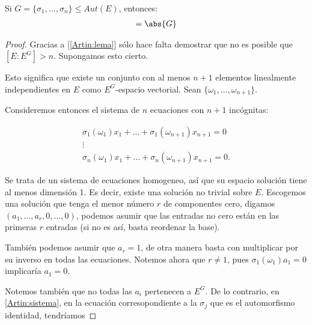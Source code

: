 ﻿

\begin{teorema}[Artin]
    Si $G=\{ \sigma_1, \dots, \sigma_n \} \leq Aut(E)$, entonces:
    \begin{align}
        [E : E^G]   =   \abs{G}
    \end{align}
\end{teorema}

\begin{proof}
    Gracias a [\ref{Artin:lema}] sólo hace falta demostrar que no es posible que $[E : E^G] > n$.
    Supongamos esto cierto.\par\null
        
    Esto significa que existe un conjunto con al menos $n+1$ elementos linealmente independientes en $E$ como
    $E^G$-espacio vectorial. Sean $\{ \omega_1, \dots, \omega_{n+1} \}$.\par\null
    
    Consideremos entonces el sistema de $n$ ecuaciones con $n+1$ incógnitas:
    
    \begin{align}\label{Artin:sistema}
        \sigma_1(\omega_1)x_1   +   \dots   +   \sigma_1(\omega_{n+1})x_{n+1}   =   0       \\
                                                                                    \vdots  \\
        \sigma_n(\omega_1)x_1   +   \dots   +   \sigma_n(\omega_{n+1})x_{n+1}   =   0.     
    \end{align}\par\null
    
    Se trata de un sistema de ecuaciones homogeneo, así que su espacio solución tiene al menos dimensión 1. 
    Es decir, existe una solución no trivial  sobre $E$. Escogemos una solución
    que tenga el menor número $r$ de componentes cero, digamos $(a_1, \dots, a_r, 0, \dots, 0)$, podemos
    asumir que las entradas no cero están en las primeras $r$ entradas (si no es así, basta reordenar la base).\par\null
    
    También podemos asumir que $a_r = 1$, de otra manera basta con multiplicar por su inverso en todas las ecuaciones.
    Notemos ahora que $r \not= 1$, pues $\sigma_1(\omega_1)a_1 = 0$ implicaría $a_1 = 0$.\par\null
    
    Notemos también que no todas las $a_i$ pertenecen a $E^G$. De lo contrario, en \eqref{Artin:sistema}, en la
    ecuación corresopondiente a la $\sigma_j$ que es el automorfismo identidad, tendríamos
    

\end{proof}
